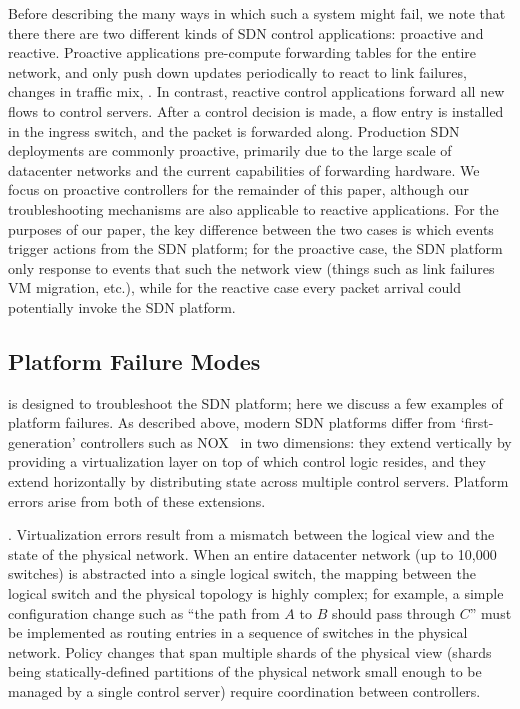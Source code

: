 Before describing the many ways in which such a system might fail, we note that there there are two different kinds of SDN control applications: proactive and reactive.
Proactive applications pre-compute forwarding tables for the entire network,
and only push down updates periodically to react to link failures, changes in
traffic mix, \etc. In contrast, reactive control applications forward all new flows to
control servers. After a control decision is made, a flow entry is installed
in the ingress switch, and the packet is forwarded along.
Production SDN deployments are commonly proactive, primarily due to the large
scale of datacenter networks and the current capabilities of forwarding hardware.
We focus on proactive controllers for the remainder of this paper,
although our troubleshooting mechanisms are also applicable to reactive
applications. For the purposes of our paper, the key difference between the two cases is which events trigger actions from the SDN platform; for the proactive case, the SDN platform only response to events that such the network view (things such as link failures VM migration, etc.), while for the reactive case every packet arrival could potentially invoke the SDN platform.

\subsection{Platform Failure Modes}

\projectname{} is designed to troubleshoot the SDN platform; here we discuss a few examples of platform failures. 
As described above, modern SDN platforms differ from
`first-generation' controllers such as NOX~\cite{nox} in two dimensions: 
they extend vertically by providing a virtualization layer on top of
which control logic resides, and they extend horizontally by
distributing state across multiple control servers. Platform errors arise from both of
these extensions.

. Virtualization errors result from a mismatch between the logical
view and the state of the physical network. When an entire datacenter
network (up to 10,000 switches) is abstracted into a single logical switch,
the mapping between the logical switch and the
physical topology is highly complex; for example, a simple configuration
change such as ``the path from $A$
 to $B$ should pass through $C$'' must be implemented as routing entries in a sequence
of switches in the physical network. Policy changes 
that span multiple shards of the physical view (shards being statically-defined
partitions of the physical network small enough to be managed by a single control
server) require coordination between controllers. 

